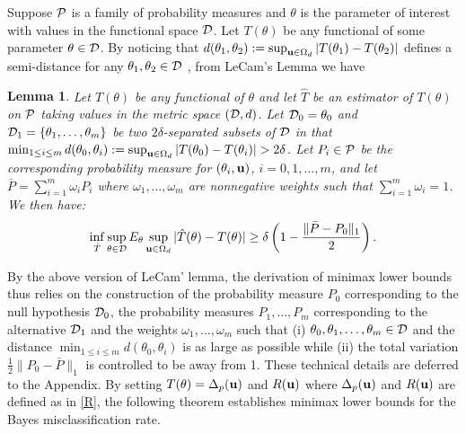 \documentclass[11pt]{article}
\newtheorem{lem}{Lemma}
\theoremstyle{definition}
\begin{document}
 Suppose ${\cal P}$ is a family of probability measures and $\theta $ is the parameter of interest with values in the functional space ${\cal D}$.
 Let $T(\theta)$ be any functional of some parameter $\theta\in {\cal D}$. By noticing that $d(\theta_1,\theta_2):=\sup_{{\bf u}\in \Omega_d}|T(\theta_1)-T(\theta_2)|$  defines a semi-distance for any $\theta_1,\theta_2\in {\cal D}$ , from LeCam's Lemma \citep{LeCam, Yu, Cai2011} we have
 \begin{lem}\label{lecam}
 	Let $T(\theta)$ be any functional of $\theta$ and let $\hat{T}$ be an estimator of $T(\theta)$ on ${\cal P}$ taking values in the metric space $({\cal D},d)$. Let ${\cal D}_0={\theta_0}$ and ${\cal D}_1=\{\theta_1,\ldots,\theta_m\}$ be two $2\delta$-separated subsets of ${\cal D}$ in that $\min_{1\leq i\leq m}d(\theta_0,\theta_i):=\sup_{{\bf u}\in \Omega_d}|T(\theta_0)-T(\theta_i)|>2\delta$. Let $P_i\in {\cal P}$ be the corresponding probability measure for $(\theta_i, {\bf u})$, $i=0,1,\ldots, m$, and let $\bar{P}=\sum_{i=1}^m\omega_iP_{i}$ where $\omega_1,\ldots,\omega_m$ are nonnegative weights such that $\sum_{i=1}^m \omega_i=1$. We then have:
 	\[
 	\inf_{\hat{T}}\sup_{\theta\in{\cal D}}E_\theta\sup_{{\bf u}\in \Omega_d}|\hat{T}(\theta)-T(\theta)| \geq \delta \left(1-\frac{\|\bar{P}-P_0\|_1}{2}\right).
 	\]
 \end{lem}
 By the above version of LeCam' lemma, the derivation of minimax lower bounds thus relies on the construction of the probability measure $P_0$ corresponding to the null hypothesis ${\cal D}_0$, the probability measures $P_1,\ldots, P_m$ corresponding to the alternative ${\cal D}_1$ and the weights $\omega_1,\ldots, \omega_m$ such that (i) $\theta_0,\theta_1,\ldots,\theta_m\in {\cal D}$ and the distance $\min_{1\leq i\leq m}d(\theta_0,\theta_i)$ is as large as possible while (ii) the total variation
 $\frac{1}{2}\|P_0-\bar{P}\|_1$ is controlled to be away from 1. These technical details are deferred to the Appendix. By setting $T(\theta)=\Delta_p(\bf{u})$ and $R({\bf u})$ where $\Delta_p({\bf u})$ and $R({\bf u})$ are defined as in \eqref{R}, the following theorem establishes minimax lower bounds for the Bayes misclassification rate.
 
\end{document}

